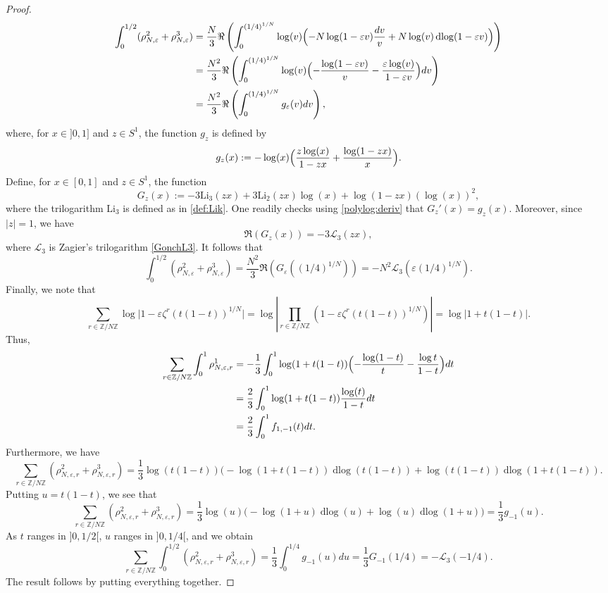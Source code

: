 \documentclass[11pt,a4,leqno]{amsart}
\theoremstyle{my theoremstyle}
\theoremstyle{dfn}
\theoremstyle{remark}
\renewcommand{\1}{\mathbbm{1}}
\newcommand{\Z}{\mathbb{Z}}
\newcommand{\e}{\varepsilon}
\numberwithin{equation}{section}
\newcommand{\dlog}{\operatorname{dlog}}
\begin{document}
\begin{proof}
\begin{align*}
\int_0^{1/2} (\rho_{N, \e}^2+\rho_{N, \e}^3) & = \frac{N}{3} \Re \left(\int_{0}^{(1/4)^{1/N}} \log (v) \Bigl( -N\log (1 -\e v) \frac{dv}{v} + N\log (v) \dlog (1 - \e v)\Bigr) \right) \\
& = \frac{N^2}{3} \Re \left(\int_{0}^{(1/4)^{1/N}} \log (v) \Bigl( - \frac{\log (1 -\e v)}{v} - \frac{\e \log (v)}{1 -\e v} \Bigr) dv \right) \\
& = \frac{N^2}{3} \Re \left(\int_{0}^{(1/4)^{1/N}} g_{\e}(v) dv \right),
\end{align*}
where, for $x\in ]0,1]$ and $z\in S^1$, the function $g_{z}$ is defined by
\begin{equation}
    g_{z}(x):=- \log (x) \Bigl(  \frac{z \log (x)}{1-z x} +\frac{\log (1-z x)}{x} \Bigr).
\end{equation}
Define, for $x\in [0, 1]$ and $z\in S^1$, the function 
\begin{equation}\label{fct:Gzx}
    G_{z}(x):=-3\mathrm{Li}_3(z x)+3\mathrm{Li}_2(z x)\log(x)+\log(1-z x)(\log(x))^2,
\end{equation}
where the trilogarithm $\mathrm{Li}_3$ is defined as in \eqref{def:Lik}. One readily checks using \eqref{polylog:deriv} that $G_{z}'(x)=g_z (x)$. Moreover, since $\vert z\vert = 1$, we have
\begin{equation}\label{GtoL3}
\Re(G_z(x))=-3\mathcal{L}_3(z x),
\end{equation}
where $\mathcal{L}_3$ is Zagier's trilogarithm \eqref{GonchL3}.
It follows that 
\begin{equation*}
\int_0^{1/2} (\rho_{N, \e}^2+\rho_{N, \e}^3) = \frac{N^2}{3} \Re \left(  G_{\e}((1/4)^{1/N}) \right)=-N^2 \mathcal{L}_3(\e (1/4)^{1/N}).
\end{equation*}
Finally, we note that 
\begin{equation*}
\sum_{r\in \Z/N\Z} \log \vert 1 -\e \zeta^r (t(1-t))^{1/N} \vert = \log \left\vert \prod_{r\in \Z/N\Z} (1 -\e \zeta^r (t(1-t))^{1/N})  \right\vert  = \log \left\vert 1+t(1-t)  \right\vert.
\end{equation*}
Thus, 
\begin{align*}
\sum_{r\in \Z/N\Z} \int_0^1 \rho_{N,\e, r}^1 &= -\frac13 \int_0^1 \log (1+t(1-t)) \Bigl( -\frac{\log (1-t)}{t} - \frac{\log t}{1-t} \Bigr) dt \\ &= \frac{2}{3} \int_0^1 \log(1+t(1-t))\frac{\log(t)}{1-t} dt \\
&=\frac{2}{3} \int_0^1 f_{1,-1}(t)dt.
\end{align*}
Furthermore, we have 
\[
\sum_{r\in \Z/N\Z} (\rho_{N,\e, r}^2+\rho_{N,\e, r}^3)=\frac{1}{3} \log (t(1-t)) \bigl( -\log (1+ t(1-t)) \dlog (t(1-t)) + \log (t(1-t)) \dlog (1+ t(1-t)).
\]
Putting $u=t(1-t)$, we see that 
\[
\sum_{r\in \Z/N\Z} (\rho_{N,\e, r}^2+\rho_{N,\e, r}^3)=\frac{1}{3} \log (u) \bigl( -\log (1+ u) \dlog (u) + \log (u) \dlog (1+ u)\bigr)=\frac 13 g_{-1}(u).
\]
As $t$ ranges in $]0, 1/2[$, $u$ ranges in $]0, 1/4[$, and we obtain 
\[
\sum_{r\in \Z/N\Z} \int_0^{1/2} (\rho_{N,\e, r}^2+\rho_{N,\e, r}^3)=\frac{1}{3} \int_{0}^{1/4} g_{-1}(u) du=\frac{1}{3} G_{-1}(1/4)=-\mathcal{L}_3(-1/4).
\]
The result follows by putting everything together.
\end{proof}
\end{document}
